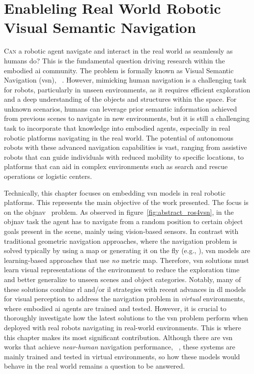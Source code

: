 \chapter{Enableling Real World Robotic Visual Semantic Navigation}\label{ch:ros4vsn:-enable-real-world-robotic-visual-semantic-navigation}

\lettrine{\textcolor{accent_color}{C}}{an} a robotic agent navigate and interact in the real world as seamlessly as humans do?
This is the fundamental question driving research within the embodied \acrshort{ai} community.
The problem is formally known as Visual Semantic Navigation (\acrshort{vsn}), \eg~\cite{ramrakhya2023,Cai2024DGMemLV,chang2020}.
However, mimicking human navigation is a challenging task for robots, particularly in unseen environments, as it requires efficient exploration and a deep understanding of the objects and structures within the space.
For unknown scenarios, humans can leverage prior semantic information achieved from previous scenes to navigate in new environments, but it is still a challenging task to incorporate that knowledge into embodied agents, especially in real robotic platforms navigating in the real world.
The potential of autonomous robots with these advanced navigation capabilities is vast, ranging from assistive robots that can guide individuals with reduced mobility to specific locations, to platforms that can aid in complex environments such as search and rescue operations or logistic centers.

Technically, this chapter focuses on embedding \acrshort{vsn} models in real robotic platforms.
This represents the main objective of the work presented.
The focus is on the \acrfull{objnav}~\cite{batra2020} problem.
As observed in figure~\ref{fig:abstract_ros4vsn}, in the \acrshort{objnav} task the agent has to navigate from a random position to certain object goals present in the scene, mainly using vision-based sensors.
In contrast with traditional geometric navigation approaches, where the navigation problem is solved typically by using a map or generating it on the fly (e.g., ), \acrshort{vsn} models are learning-based approaches that use \emph{no} metric map.
Therefore, \acrshort{vsn} solutions must learn visual representations of the environment to reduce the exploration time and better generalize to unseen scenes and object categories.
Notably, many of these solutions combine \acrshort{rl} and/or \acrshort{il} strategies with recent advances in \acrshort{dl} models for visual perception to address the navigation problem in \emph{virtual} environments, where embodied \acrshort{ai} agents are trained and tested.
However, it is crucial to thoroughly investigate how the latest solutions to the \acrshort{vsn} problem perform when deployed with real robots navigating in real-world environments.
This is where this chapter makes its most significant contribution.
Although there are \acrshort{vsn} works that achieve \textit{near-human} navigation performance, \eg~\cite{ramrakhya2023}, these systems are mainly trained and tested in virtual environments, so how these models would behave in the real world remains a question to be answered.

